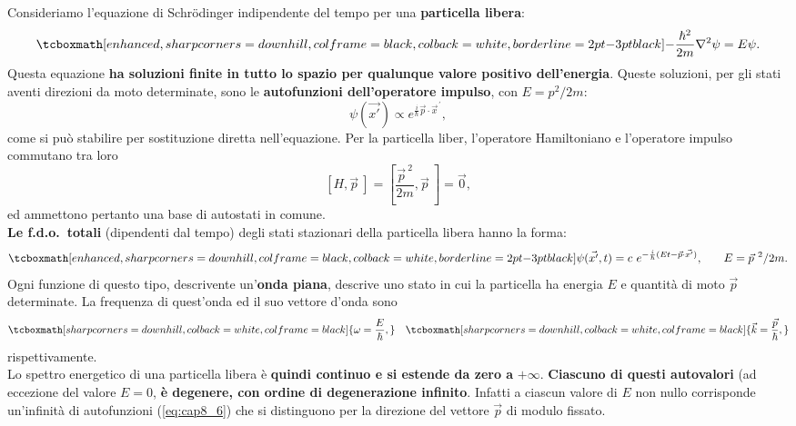 Consideriamo l'equazione di Schr\"{o}dinger indipendente del tempo per una \textbf{particella libera}:
	\begin{equation}
		\tcboxmath[enhanced, sharp corners=downhill, colframe=black, colback=white, borderline={2pt}{-3pt}{black}]{
			-\frac{\hbar ^2}{2m}\nabla ^2 \psi = E\psi.
			}
	\end{equation}
Questa equazione \textbf{ha soluzioni finite in tutto lo spazio per qualunque valore positivo dell'energia}. Queste soluzioni, per gli stati aventi direzioni da moto determinate, sono le \textbf{autofunzioni dell'operatore impulso}, con $E= p^2/2m$:
	\begin{equation}
		\psi (\vec{x'}) \propto e ^{\frac{i}{\hbar}\vec{p}\cdot {\vec{x}}^{\, \prime}},
	\end{equation}
come si può stabilire per sostituzione diretta nell'equazione. Per la particella liber, l'operatore Hamiltoniano e l'operatore impulso commutano tra loro
	\begin{equation}
		\left[ H, \vec{p}\ \right] = \left[ \frac{ {\vec{p}}^{\ 2}}{2m}, \vec{p}\ \right] =\vec{0},
	\end{equation}
ed ammettono pertanto una base di autostati in comune.\\
\textbf{Le f.d.o.~totali} (dipendenti dal tempo) degli stati stazionari della particella libera hanno la forma:
	\begin{equation}
		\tcboxmath[enhanced, sharp corners=downhill, colframe=black, colback=white, borderline={2pt}{-3pt}{black}]{
			\psi (\vec{x'}, t) = c\ e^{-\frac{i}{\hbar} (Et - \vec{p}\cdot \vec{x'})},} \qquad E={\vec{p}}^{\ 2}/{2m}.
	\label{eq:cap8_6}
	\end{equation}
Ogni funzione di questo tipo, descrivente un'\textbf{onda piana}, descrive uno stato in cui la particella ha energia $E$ e quantità di moto $\vec{p}$ determinate. La frequenza di quest'onda ed il suo vettore d'onda sono
	\begin{equation}
		\tcboxmath[sharp corners=downhill, colback=white, colframe=black]{
		\omega = \frac{E}{\hbar},
		} \quad 
	\tcboxmath[sharp corners=downhill, colback=white, colframe=black]{
		\vec{k}= \frac{\vec{p}}{\hbar},
		}
	\end{equation}
rispettivamente.\\

Lo spettro energetico di una particella libera è \textbf{quindi continuo e si estende da zero a} $+\infty$. \textbf{Ciascuno di questi autovalori} (ad eccezione del valore $E=0$, \textbf{è degenere, con ordine di degenerazione infinito}. Infatti a ciascun valore di $E$ non nullo corrisponde un'infinità di autofunzioni (\ref{eq:cap8_6}) che si distinguono per la direzione del vettore $\vec{p}$ di modulo fissato.
